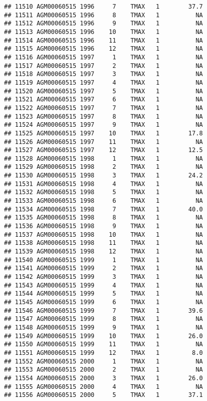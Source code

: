\documentclass{article}\usepackage[]{graphicx}\usepackage[]{color}
\makeatletter
\newenvironment{kframe}{%
 \def\at@end@of@kframe{}%
 \ifinner\ifhmode%
  \def\at@end@of@kframe{\end{minipage}}%
  \begin{minipage}{\columnwidth}%
 \fi\fi%
 \def\FrameCommand##1{\hskip\@totalleftmargin \hskip-\fboxsep
 \colorbox{shadecolor}{##1}\hskip-\fboxsep
     \hskip-\linewidth \hskip-\@totalleftmargin \hskip\columnwidth}%
 \MakeFramed {\advance\hsize-\width
   \@totalleftmargin\z@ \linewidth\hsize
   \@setminipage}}%
 {\par\unskip\endMakeFramed%
 \at@end@of@kframe}
\newenvironment{knitrout}{}{} %
\makeatother
\begin{document}
\begin{knitrout}
\begin{kframe}
\begin{verbatim}
## 11510 AGM00060515 1996     7    TMAX   1        37.7
## 11511 AGM00060515 1996     8    TMAX   1          NA
## 11512 AGM00060515 1996     9    TMAX   1          NA
## 11513 AGM00060515 1996    10    TMAX   1          NA
## 11514 AGM00060515 1996    11    TMAX   1          NA
## 11515 AGM00060515 1996    12    TMAX   1          NA
## 11516 AGM00060515 1997     1    TMAX   1          NA
## 11517 AGM00060515 1997     2    TMAX   1          NA
## 11518 AGM00060515 1997     3    TMAX   1          NA
## 11519 AGM00060515 1997     4    TMAX   1          NA
## 11520 AGM00060515 1997     5    TMAX   1          NA
## 11521 AGM00060515 1997     6    TMAX   1          NA
## 11522 AGM00060515 1997     7    TMAX   1          NA
## 11523 AGM00060515 1997     8    TMAX   1          NA
## 11524 AGM00060515 1997     9    TMAX   1          NA
## 11525 AGM00060515 1997    10    TMAX   1        17.8
## 11526 AGM00060515 1997    11    TMAX   1          NA
## 11527 AGM00060515 1997    12    TMAX   1        12.5
## 11528 AGM00060515 1998     1    TMAX   1          NA
## 11529 AGM00060515 1998     2    TMAX   1          NA
## 11530 AGM00060515 1998     3    TMAX   1        24.2
## 11531 AGM00060515 1998     4    TMAX   1          NA
## 11532 AGM00060515 1998     5    TMAX   1          NA
## 11533 AGM00060515 1998     6    TMAX   1          NA
## 11534 AGM00060515 1998     7    TMAX   1        40.0
## 11535 AGM00060515 1998     8    TMAX   1          NA
## 11536 AGM00060515 1998     9    TMAX   1          NA
## 11537 AGM00060515 1998    10    TMAX   1          NA
## 11538 AGM00060515 1998    11    TMAX   1          NA
## 11539 AGM00060515 1998    12    TMAX   1          NA
## 11540 AGM00060515 1999     1    TMAX   1          NA
## 11541 AGM00060515 1999     2    TMAX   1          NA
## 11542 AGM00060515 1999     3    TMAX   1          NA
## 11543 AGM00060515 1999     4    TMAX   1          NA
## 11544 AGM00060515 1999     5    TMAX   1          NA
## 11545 AGM00060515 1999     6    TMAX   1          NA
## 11546 AGM00060515 1999     7    TMAX   1        39.6
## 11547 AGM00060515 1999     8    TMAX   1          NA
## 11548 AGM00060515 1999     9    TMAX   1          NA
## 11549 AGM00060515 1999    10    TMAX   1        26.0
## 11550 AGM00060515 1999    11    TMAX   1          NA
## 11551 AGM00060515 1999    12    TMAX   1         8.0
## 11552 AGM00060515 2000     1    TMAX   1          NA
## 11553 AGM00060515 2000     2    TMAX   1          NA
## 11554 AGM00060515 2000     3    TMAX   1        26.0
## 11555 AGM00060515 2000     4    TMAX   1          NA
## 11556 AGM00060515 2000     5    TMAX   1        37.1

\end{verbatim}
\end{kframe}
\end{knitrout}
\end{document}
